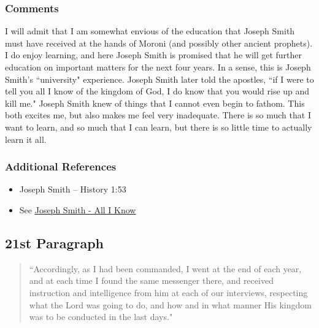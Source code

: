 \documentclass[12pt]{report}
\begin{document}
\subsubsection{Comments\label{js:comments20}}
I will admit that I am somewhat envious of the education that Joseph Smith must have received at the hands of Moroni (and possibly other ancient prophets). I do enjoy learning, and here Joseph Smith is promised that he will get further education on important matters for the next four years.  In a sense, this is Joseph Smith's ``university" experience.  Joseph Smith later told the apostles, ``if I were to tell you all I know of the kingdom of God, I do know that you would rise up and kill me."  Joseph Smith knew of things that I cannot even begin to fathom.  This both excites me, but also makes me feel very inadequate.  There is so much that I want to learn, and so much that I can learn, but there is so little time to actually learn it all.

\subsubsection{Additional References\label{js:references20}}
\begin{itemize}
\item Joseph Smith -- History 1:53
\item See \href{http://emp.byui.edu/satterfieldb/quotes/If%20I%20were%20to%20tell%20you%20all%20I%20know%20%20JosephSmith.html}{Joseph Smith - All I Know}
\end{itemize}

\subsection{21st Paragraph\label{js:21st}}
\begin{center}
\begin{quote}
``Accordingly, as I had been commanded, I went at the end of each year, and at each time I found the same messenger there, and received instruction and intelligence from him at each of our interviews, respecting what the Lord was going to do, and how and in what manner His kingdom was to be conducted in the last days."
\end{quote}
\end{center}
\end{document}
